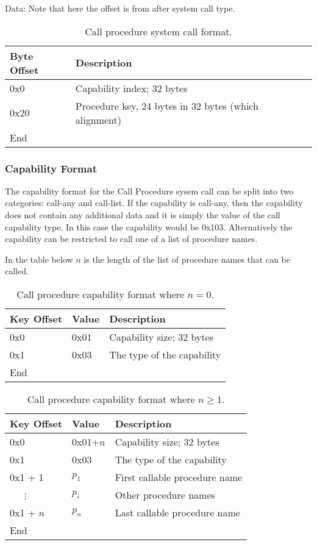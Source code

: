 \documentclass[english,a4paper]{article}
\let\oldparagraph\subsubsection
\renewcommand{\subsubsection}[1]{\oldparagraph{#1}\mbox{}}
\begin{document}
Data: Note that here the offset is from after system call type.

\begin{table}[H]
  \caption{Call procedure system call format.}
  \centering{}%
  \begin{tabular}{l|p{}}
    \hline
    Byte Offset & Description\tabularnewline
    \hline
    \hline
    0x0 & Capability index; 32 bytes \tabularnewline
    0x20 & Procedure key, 24 bytes in 32 bytes (which alignment) \tabularnewline
    \hline
    End &  \tabularnewline
    \hline
  \end{tabular}
\end{table}

\subsubsection{Capability Format}
The capability format for the Call Procedure sysem call can be split into two
categories: call-any and call-list. If the capability is call-any, then the
capability does not contain any additional data and it is simply the value of
the call capability type. In this case the capability would be 0x103.
Alternatively the capability can be restricted to call one of a list of
procedure names.

In the table below $n$ is the length of the list of procedure names that can be
called.

\begin{table}[H]
  \caption{Call procedure capability format where $n = 0$.}
  \centering{}%
  \begin{tabular}{l|l|p{}}
    \hline
    Key Offset & Value & Description\tabularnewline
    \hline
    \hline
    0x0 & 0x01 & Capability size; 32 bytes \tabularnewline
    0x1 & 0x03 & The type of the capability \tabularnewline
    \hline
    End &  \tabularnewline
    \hline
  \end{tabular}
\end{table}

\begin{table}[H]
  \caption{Call procedure capability format where $n \geq 1$.}
  \centering{}%
  \begin{tabular}{l|l|p{}}
    \hline
    Key Offset & Value & Description\tabularnewline
    \hline
    \hline
    0x0 & 0x01+$n$ & Capability size; 32 bytes \tabularnewline
    0x1 & 0x03 & The type of the capability \tabularnewline
    0x1 + 1 & $p_1$ & First callable procedure name \tabularnewline
    ~~~$\vdots$ & $p_i$ & Other procedure names \tabularnewline
    0x1 + $n$ & $p_n$ & Last callable procedure name \tabularnewline
    \hline
    End &  \tabularnewline
    \hline
  \end{tabular}
\end{table}
\end{document}
